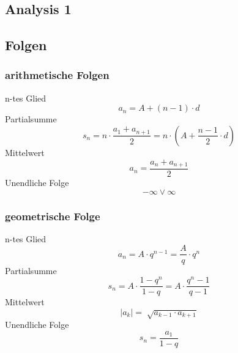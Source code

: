\documentclass[10pt,landscape,a4paper]{article}
\begin{document}
\small
\begin{multicols*}{5}
\section*{Analysis 1}
\subsection*{Folgen}
\subsubsection*{arithmetische Folgen}
n-tes Glied
\[
		a_n = A + (n-1)\cdot d
\]
Partialsumme
\[
		s_n = n \cdot \frac{a_1 + a_{n+1}}{2} = n \cdot(A+ \frac{n-1}{2} \cdot d)
\]
Mittelwert
\[
		a_n = \frac{a_n + a_{n+1}}{2} 
\]
Unendliche Folge
\[
-\infty \lor \infty
\]
\subsubsection*{geometrische Folge}
n-tes Glied
\[
a_n = A \cdot q^{n-1} = \frac{A}{q} \cdot q^{n}
\]
Partialsumme
\[
s_n = A \cdot \frac{1-q^{n}}{1-q} = A \cdot \frac{q^{n}-1}{q-1} 
\]
Mittelwert
\[
		|a_k| = \sqrt[]{a_{k-1}\cdot a_{k+1}}
\]
Unendliche Folge
\[
s_n = \frac{a_1}{1-q} 
\]
\end{multicols*}
\end{document}
